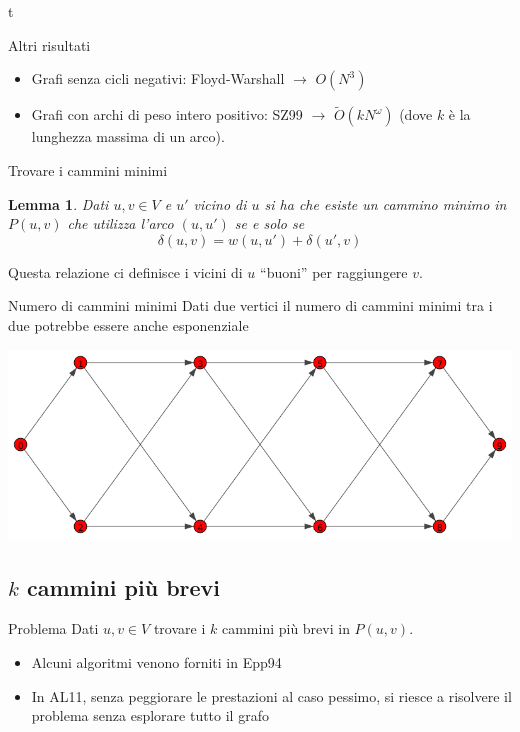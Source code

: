 t \documentclass{beamer}
\newcounter{counter1}
\theoremstyle{plain}
\newtheorem{mylem}[counter1]{Lemma}
\theoremstyle{definition}
\theoremstyle{remark}
\newcommand{\pa}[1]{\left(#1\right)}
\begin{document}
\begin{frame}{Altri risultati}
  \begin{itemize}
  \item Grafi senza cicli negativi: Floyd-Warshall $\rightarrow$ $O \pa{N^3}$
  \item Grafi con archi di peso intero positivo: SZ99 $\rightarrow$
    $\tilde O \pa{k N^\omega}$ (dove $k$ \`e la lunghezza massima di
    un arco).
  \end{itemize}
\end{frame}

\begin{frame}{Trovare i cammini minimi}
  \begin{mylem}
    Dati $u,v \in V$ e $u'$ vicino di $u$ si ha che esiste un cammino
    minimo in $P(u,v)$ che utilizza l'arco $(u,u')$ se e solo se
    \[ \delta \pa{ u,v} = w\pa{ u,u' } + \delta \pa{ u',v} \]
  \end{mylem}
  \vfill
  
  Questa relazione ci definisce i vicini di $u$ ``buoni'' per
  raggiungere $v$.
\end{frame}

\begin{frame}{Numero di cammini minimi}
  Dati due vertici il numero di cammini minimi tra i due potrebbe
  essere anche esponenziale
  \vfill
  
  \includegraphics[width=\textwidth]{diamantecatena}
\end{frame}


\subsection{$k$ cammini pi\`u brevi}

\begin{frame}
  \begin{block}{Problema}
    Dati $u,v \in V$ trovare i $k$ cammini pi\`u brevi in $P(u,v)$.
  \end{block}
  \vfill
  
  \begin{itemize}
  \item Alcuni algoritmi venono forniti in Epp94
  \item In AL11, senza peggiorare le prestazioni al caso pessimo, si
    riesce a risolvere il problema senza esplorare tutto il grafo
  \end{itemize}
  
\end{frame}
\end{document}
